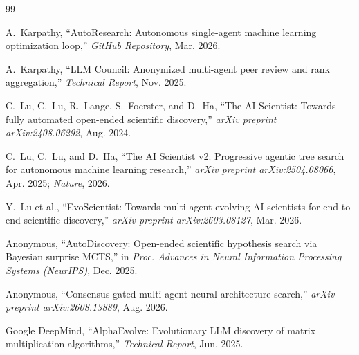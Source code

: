 \documentclass[10pt,twocolumn,3p,times]{article}
\begin{document}
\begin{thebibliography}{99}

A.~Karpathy, ``AutoResearch: Autonomous single-agent machine learning optimization loop,'' \textit{GitHub Repository}, Mar. 2026.

A.~Karpathy, ``LLM Council: Anonymized multi-agent peer review and rank aggregation,'' \textit{Technical Report}, Nov. 2025.

C.~Lu, C.~Lu, R.~Lange, S.~Foerster, and D.~Ha, ``The AI Scientist: Towards fully automated open-ended scientific discovery,'' \textit{arXiv preprint arXiv:2408.06292}, Aug. 2024.

C.~Lu, C.~Lu, and D.~Ha, ``The AI Scientist v2: Progressive agentic tree search for autonomous machine learning research,'' \textit{arXiv preprint arXiv:2504.08066}, Apr. 2025; \textit{Nature}, 2026.

Y.~Lu et al., ``EvoScientist: Towards multi-agent evolving AI scientists for end-to-end scientific discovery,'' \textit{arXiv preprint arXiv:2603.08127}, Mar. 2026.

Anonymous, ``AutoDiscovery: Open-ended scientific hypothesis search via Bayesian surprise MCTS,'' in \textit{Proc. Advances in Neural Information Processing Systems (NeurIPS)}, Dec. 2025.

Anonymous, ``Consensus-gated multi-agent neural architecture search,'' \textit{arXiv preprint arXiv:2608.13889}, Aug. 2026.

Google DeepMind, ``AlphaEvolve: Evolutionary LLM discovery of matrix multiplication algorithms,'' \textit{Technical Report}, Jun. 2025.

\end{thebibliography}
\end{document}
